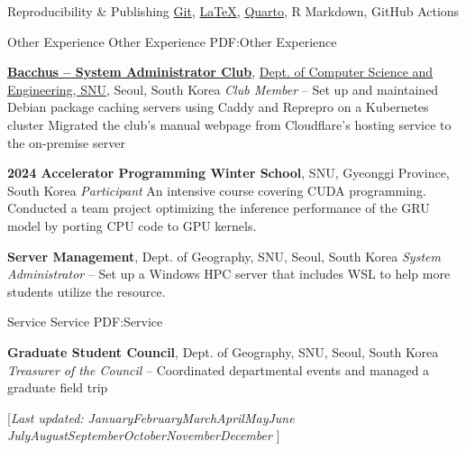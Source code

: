 \documentclass[letterpaper,MMMyyyy,nonstopmode]{simpleresumecv}
\newcommand{\CVNote}{Last updated: %
  \ifcase\the\month
    \or January\or February\or March\or April\or May\or June
    \or July\or August\or September\or October\or November\or December
  \fi \space \the\year}
\begin{document}
\begin{Body}
\Gap
\BulletItem
Reproducibility \& Publishing
\SubBulletItem
\href{https://git-scm.com/}{Git}, \href{https://www.latex-project.org/}{LaTeX}, \href{https://quarto.org/}{Quarto}, R Markdown, GitHub Actions





\Section
{Other Experience}
{Other Experience}
{PDF:Other Experience}

\Entry
\textbf{\href{https://github.com/bacchus-snu}{Bacchus – System Administrator Club}}, \href{https://cse.snu.ac.kr/en/about/student-clubs?selected=Bacchus}{Dept. of Computer Science and Engineering, SNU}, Seoul, South Korea
\Gap
\textit{      Club Member}
\hfill
{} -- %
\Gap
\SubBulletItem
Set up and maintained Debian package caching servers using Caddy and Reprepro on a Kubernetes cluster
\Gap
\SubBulletItem
Migrated the club's manual webpage from Cloudflare's hosting service to the on-premise server
\BigGap

\Entry
\textbf{2024 Accelerator Programming Winter School}, SNU, Gyeonggi Province, South Korea
\Gap
\textit{      Participant}
\hfill
{}
\Gap
\SubBulletItem
An intensive course covering CUDA programming.
\Gap
\SubBulletItem
Conducted a team project optimizing the inference performance of the GRU model by porting CPU code to GPU kernels.
\BigGap

\Entry
\textbf{Server Management}, Dept. of Geography, SNU, Seoul, South Korea
\Gap
\textit{      System Administrator}
\hfill
{} --
\Gap
\SubBulletItem
Set up a Windows HPC server that includes WSL to help more students utilize the resource.
\Gap



\Section
{Service}
{Service}
{PDF:Service}

\Entry
\textbf{Graduate Student Council}, Dept. of Geography, SNU, Seoul, South Korea
\Gap
\textit{      Treasurer of the Council}
\hfill
{} --
\Gap
\SubBulletItem
Coordinated departmental events and managed a graduate field trip



\end{Body}


\UseNoteFont%
\null\hfill%
[\textit{\CVNote}]
\end{document}
